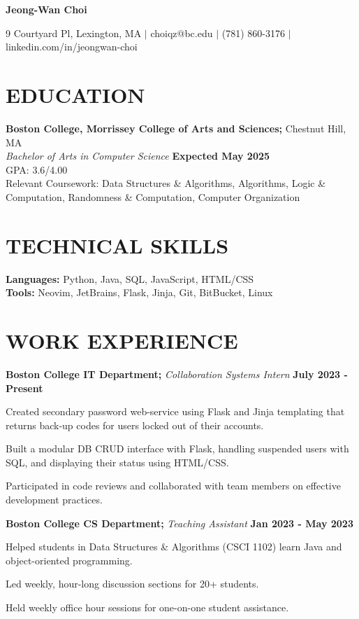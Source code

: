 \documentclass[11pt]{article}
\begin{document}
\begin{center}
\textbf{\LARGE Jeong-Wan Choi}
\end{center}

\begin{center}
9 Courtyard Pl, Lexington, MA $|$ choiqz@bc.edu $|$ (781) 860-3176 $|$ linkedin.com/in/jeongwan-choi 
\end{center}

\section*{EDUCATION}
\textbf{Boston College, Morrissey College of Arts and Sciences;} Chestnut Hill, MA \\
\textit{Bachelor of Arts in Computer Science} \hfill \textbf{Expected May 2025} \\
GPA: 3.6/4.00 \\
Relevant Coursework: Data Structures \& Algorithms, Algorithms, Logic \& Computation, Randomness \& Computation, Computer Organization

\section*{TECHNICAL SKILLS}
\textbf{Languages:} Python, Java, SQL, JavaScript, HTML/CSS\\
\textbf{Tools:} Neovim, JetBrains, Flask, Jinja, Git, BitBucket, Linux

\section*{WORK EXPERIENCE}
\textbf{Boston College IT Department;} \textit{Collaboration Systems Intern} \hfill \textbf{July 2023 - Present}
\begin{sublist}
	\item Created secondary password web-service using Flask and Jinja templating that returns back-up codes for users locked out of their accounts. 
	\item Built a modular DB CRUD interface with Flask, handling suspended users with SQL, and displaying their status using HTML/CSS.
	\item Participated in code reviews and collaborated with team members on effective development practices.
\end{sublist}

\raggedright
\textbf{Boston College CS Department;} \textit{Teaching Assistant} \hfill \textbf{Jan 2023 - May 2023}
\begin{sublist}
	\item Helped students in Data Structures \& Algorithms (CSCI 1102) learn Java and object-oriented programming. 
	\item Led weekly, hour-long discussion sections for 20+ students. 
	\item Held weekly office hour sessions for one-on-one student assistance.
\end{sublist}
\end{document}
